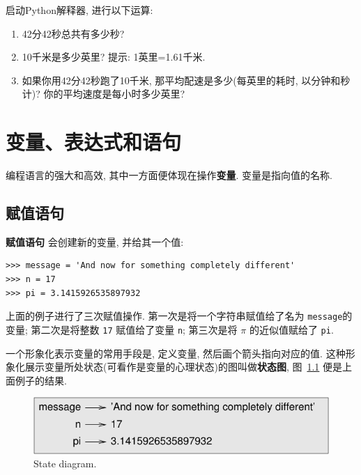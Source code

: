 \documentclass[10pt]{book}
\begin{document}
\begin{exercise}

启动Python解释器, 进行以下运算:

\begin{enumerate}

\item 42分42秒总共有多少秒?

\item 10千米是多少英里? 提示: 1英里=1.61千米. 

\item 如果你用42分42秒跑了10千米, 那平均配速是多少(每英里的耗时, 以分钟和秒计)?
你的平均速度是每小时多少英里?


\end{enumerate}

\end{exercise}


\chapter{变量、表达式和语句}

编程语言的强大和高效, 其中一方面便体现在操作{\bf 变量}. 
变量是指向值的名称. 


\section{赋值语句}
\label{variables}

{\bf 赋值语句} 会创建新的变量, 并给其一个值: 

\begin{verbatim}
>>> message = 'And now for something completely different'
>>> n = 17
>>> pi = 3.1415926535897932
\end{verbatim}
%
上面的例子进行了三次赋值操作. 
第一次是将一个字符串赋值给了名为 {\tt message}的变量;
第二次是将整数 {\tt 17} 赋值给了变量 {\tt n};
第三次是将 $\pi$ 的近似值赋给了 {\tt pi}. 

一个形象化表示变量的常用手段是, 定义变量, 然后画个箭头指向对应的值. 
这种形象化展示变量所处状态(可看作是变量的心理状态)的图叫做{\bf 状态图}, 
图~\ref{fig.state2} 便是上面例子的结果. 

\begin{figure}
\centerline
{\includegraphics[scale=0.8]{figs/state2.pdf}}
\caption{State diagram.}
\label{fig.state2}
\end{figure}
\end{document}
